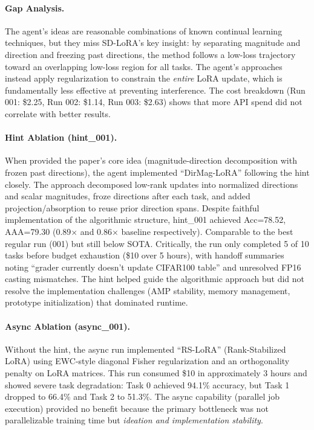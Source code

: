 \documentclass[11pt]{article}
\theoremstyle{plain}
\theoremstyle{definition}
\theoremstyle{remark}
\begin{document}
\paragraph{Gap Analysis.} The agent's ideas are reasonable combinations of known continual learning techniques, but they miss SD-LoRA's key insight: by separating magnitude and direction and freezing past directions, the method follows a low-loss trajectory toward an overlapping low-loss region for all tasks. The agent's approaches instead apply regularization to constrain the \textit{entire} LoRA update, which is fundamentally less effective at preventing interference. The cost breakdown (Run 001: \$2.25, Run 002: \$1.14, Run 003: \$2.63) shows that more API spend did not correlate with better results.

\paragraph{Hint Ablation (hint\_001).} When provided the paper's core idea (magnitude-direction decomposition with frozen past directions), the agent implemented ``DirMag-LoRA'' following the hint closely. The approach decomposed low-rank updates into normalized directions and scalar magnitudes, froze directions after each task, and added projection/absorption to reuse prior direction spans. Despite faithful implementation of the algorithmic structure, hint\_001 achieved Acc=78.52, AAA=79.30 (0.89$\times$ and 0.86$\times$ baseline respectively). Comparable to the best regular run (001) but still below SOTA. Critically, the run only completed 5 of 10 tasks before budget exhaustion (\$10 over 5 hours), with handoff summaries noting ``grader currently doesn't update CIFAR100 table'' and unresolved FP16 casting mismatches. The hint helped guide the algorithmic approach but did not resolve the implementation challenges (AMP stability, memory management, prototype initialization) that dominated runtime. 

\paragraph{Async Ablation (async\_001).} Without the hint, the async run implemented ``RS-LoRA'' (Rank-Stabilized LoRA) using EWC-style diagonal Fisher regularization and an orthogonality penalty on LoRA matrices. This run consumed \$10 in approximately 3 hours and showed severe task degradation: Task 0 achieved 94.1\% accuracy, but Task 1 dropped to 66.4\% and Task 2 to 51.3\%. The async capability (parallel job execution) provided no benefit because the primary bottleneck was not parallelizable training time but \textit{ideation and implementation stability}.
\end{document}
